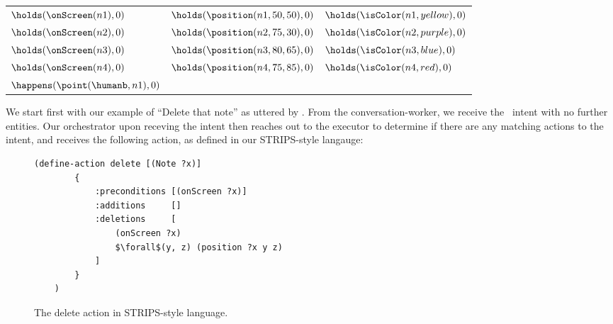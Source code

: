 \begin{center}
\begin{tabular}{ l l l }
    $\holds(\onScreen(n1), 0)$ &
    $\holds(\position(n1, 50, 50), 0)$ &
    $\holds(\isColor(n1, yellow), 0)$ \\
    $\holds(\onScreen(n2), 0)$ &
    $\holds(\position(n2, 75, 30), 0)$ &
    $\holds(\isColor(n2, purple), 0)$ \\
    $\holds(\onScreen(n3), 0)$ &
    $\holds(\position(n3, 80, 65), 0)$ &
    $\holds(\isColor(n3, blue), 0)$ \\
    $\holds(\onScreen(n4), 0)$ &
    $\holds(\position(n4, 75, 85), 0)$ &
    $\holds(\isColor(n4, red), 0)$ \\
    $\happens(\point(\humanb, n1), 0)$
\end{tabular}
\end{center}

We start first with our example of ``Delete that note'' as uttered by \humanb. From the conversation-worker,
we receive the \delete\ intent with no further entities. Our orchestrator upon receving the intent then
reaches out to the executor to determine if there are any matching actions to the intent, and receives
the following action, as defined in our STRIPS-style langauge:

\begin{figure}[ht]
\begin{lstlisting}[mathescape=true]
    (define-action delete [(Note ?x)]
        {
            :preconditions [(onScreen ?x)]
            :additions     []
            :deletions     [
                (onScreen ?x)
                $\forall$(y, z) (position ?x y z)
            ]
        }
    )
\end{lstlisting}
\caption{The delete action in STRIPS-style language.}
\end{figure}

